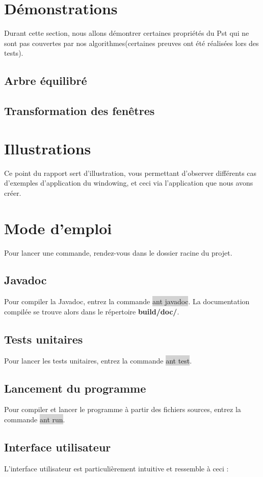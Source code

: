 \documentclass[10pt,a4paper]{article}
\begin{document}
\section{Démonstrations}
Durant cette section, nous allons démontrer certaines propriétés du Pst qui ne sont pas couvertes par nos algorithmes(certaines preuves ont été réalisées lors des tests).
\subsection{Arbre équilibré}

\subsection{Transformation des fenêtres}

\section{Illustrations}
Ce point du rapport sert d'illustration, vous permettant d'observer différents cas d'exemples d'application du windowing, et ceci via l'application que nous avons créer.

\newpage
\section{Mode d'emploi}
Pour lancer une commande, rendez-vous dans le dossier racine du projet.

\subsection{Javadoc}
Pour compiler la Javadoc, entrez la commande \colorbox{lightgray}{ant javadoc}. La documentation compilée se trouve alors dans le répertoire \textbf{build/doc/}.

\subsection{Tests unitaires}
Pour lancer les tests unitaires, entrez la commande \colorbox{lightgray}{ant test}.

\subsection{Lancement du programme}
Pour compiler et lancer le programme à partir des fichiers sources, entrez la commande \colorbox{lightgray}{ant run}.

\subsection{Interface utilisateur}
L'interface utilisateur est particulièrement intuitive et ressemble à ceci :
\end{document}
